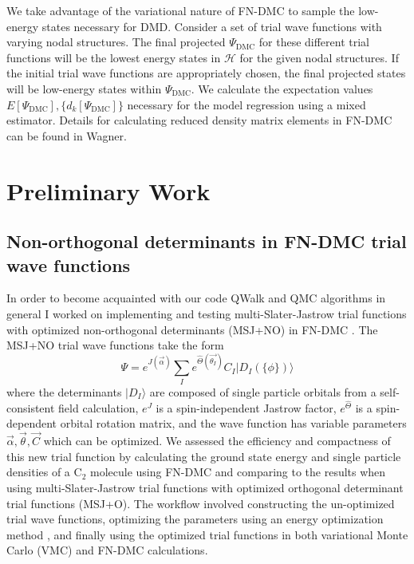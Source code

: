\documentclass[12pt]{article}
\begin{document}
We take advantage of the variational nature of FN-DMC to sample the low-energy states necessary for DMD.
Consider a set of trial wave functions with varying nodal structures.
The final projected $\Psi_\text{DMC}$ for these different trial functions will be the lowest energy states in $\mathcal{H}$ for the given nodal structures.
If the initial trial wave functions are appropriately chosen, the final projected states will be low-energy states within $\Psi_\text{DMC}$.
We calculate the expectation values $E[\Psi_\text{DMC}], \{d_k[\Psi_\text{DMC}]\}$ necessary for the model regression using a mixed estimator.
Details for calculating reduced density matrix elements in FN-DMC can be found in Wagner.

\section{Preliminary Work}
\subsection{Non-orthogonal determinants in FN-DMC trial wave functions}
In order to become acquainted with our code QWalk \cite{WAGNER20093390} and QMC algorithms in general I worked on implementing and testing multi-Slater-Jastrow trial functions with optimized non-orthogonal determinants (MSJ+NO) in FN-DMC \cite{Pathak2018}.
The MSJ+NO trial wave functions take the form
\begin{equation}
\Psi=e^{J(\vec{\alpha})} \sum_I e^{\hat{\Theta}(\vec{\theta_I})} C_I |D_I (\{ \phi\})\rangle
\end{equation}
where the determinants $|D_I\rangle$ are composed of single particle orbitals from a self-consistent field calculation, $e^J$ is a spin-independent Jastrow factor, $e^{\hat{\Theta}}$ is a spin-dependent orbital rotation matrix, and the wave function has variable parameters $\vec{\alpha}, \vec{\theta}, \vec{C}$ which can be optimized.
We assessed the efficiency and compactness of this new trial function by calculating the ground state energy and single particle densities of a C$_2$ molecule using FN-DMC and comparing to the results when using multi-Slater-Jastrow trial functions with optimized orthogonal determinant trial functions (MSJ+O). 
The workflow involved constructing the un-optimized trial wave functions, optimizing the parameters using an energy optimization method \cite{Toulouse2007}, and finally using the optimized trial functions in both variational Monte Carlo (VMC) and FN-DMC calculations. 
\end{document}
